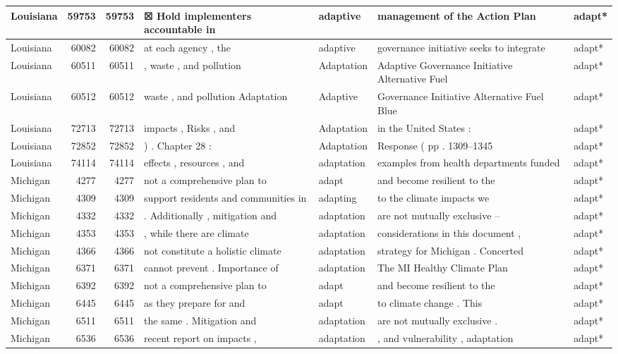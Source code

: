 \documentclass[
]{article}
\begin{document}
\begin{table}
\begin{tabular}[t]{l|r|r|l|l|l|l}
\hline
Louisiana & 59753 & 59753 & ☒ Hold implementers accountable in & adaptive & management of the Action Plan & adapt*\\
\hline
Louisiana & 60082 & 60082 & at each agency , the & adaptive & governance initiative seeks to integrate & adapt*\\
\hline
Louisiana & 60511 & 60511 & , waste , and pollution & Adaptation & Adaptive Governance Initiative Alternative Fuel & adapt*\\
\hline
Louisiana & 60512 & 60512 & waste , and pollution Adaptation & Adaptive & Governance Initiative Alternative Fuel Blue & adapt*\\
\hline
Louisiana & 72713 & 72713 & impacts , Risks , and & Adaptation & in the United States : & adapt*\\
\hline
Louisiana & 72852 & 72852 & ) . Chapter 28 : & Adaptation & Response ( pp . 1309–1345 & adapt*\\
\hline
Louisiana & 74114 & 74114 & effects , resources , and & adaptation & examples from health departments funded & adapt*\\
\hline
Michigan & 4277 & 4277 & not a comprehensive plan to & adapt & and become resilient to the & adapt*\\
\hline
Michigan & 4309 & 4309 & support residents and communities in & adapting & to the climate impacts we & adapt*\\
\hline
Michigan & 4332 & 4332 & . Additionally , mitigation and & adaptation & are not mutually exclusive – & adapt*\\
\hline
Michigan & 4353 & 4353 & , while there are climate & adaptation & considerations in this document , & adapt*\\
\hline
Michigan & 4366 & 4366 & not constitute a holistic climate & adaptation & strategy for Michigan . Concerted & adapt*\\
\hline
Michigan & 6371 & 6371 & cannot prevent . Importance of & adaptation & The MI Healthy Climate Plan & adapt*\\
\hline
Michigan & 6392 & 6392 & not a comprehensive plan to & adapt & and become resilient to the & adapt*\\
\hline
Michigan & 6445 & 6445 & as they prepare for and & adapt & to climate change . This & adapt*\\
\hline
Michigan & 6511 & 6511 & the same . Mitigation and & adaptation & are not mutually exclusive . & adapt*\\
\hline
Michigan & 6536 & 6536 & recent report on impacts , & adaptation & , and vulnerability , adaptation & adapt*\\

\end{tabular}
\end{table}
\end{document}
